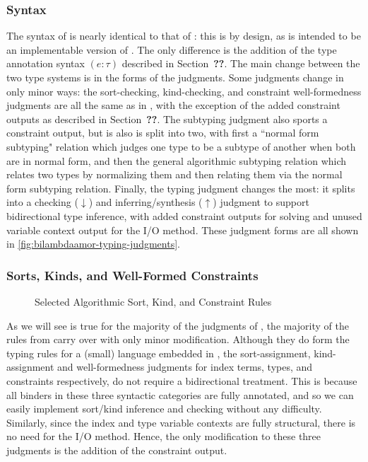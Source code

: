 \subsubsection{Syntax}
The syntax of \bilambdaamor is nearly identical to that of \dlambdaamor: this is by design, as \bilambdaamor is intended to be an implementable version of \dlambdaamor. The only difference is the addition of the type annotation syntax $(e : \tau)$ described in Section~\textbf{??}. The main change between the two type systems is in the forms of the judgments. Some judgments change in only minor ways: the sort-checking, kind-checking, and constraint well-formedness judgments are all the same as in \dlambdaamor, with the exception of the added constraint outputs as described in Section~\textbf{??}. The subtyping judgment also sports a constraint output, but is also is split into two, with first a ``normal form subtyping" relation which judges one type to be a subtype of another when both are in normal form, and then the general algorithmic subtyping relation which relates two types by normalizing them and then relating them via the normal form subtyping relation. Finally, the typing judgment changes the most: it splits into a checking ($\downarrow$) and inferring/synthesis ($\uparrow$) judgment to support bidirectional type inference, with added constraint outputs for solving and unused variable context output for the I/O method. These judgment forms are all shown in \autoref{fig:bilambdaamor-typing-judgments}.


\subsubsection{Sorts, Kinds, and Well-Formed Constraints}
\begin{figure}

\caption{Selected Algorithmic Sort, Kind, and Constraint Rules}
\label{fig:bilambdaamor-selected-sort-kind-constr-rules}
\end{figure}

As we will see is true for the majority of the judgments of \bilambdaamor, the majority of the rules from \dlambdaamor carry over with only minor modification. Although they do form the typing rules for a (small) language embedded in \bilambdaamor, the sort-assignment, kind-assignment and well-formedness judgments for index terms, types, and constraints respectively, do not require a bidirectional treatment. This is because all binders in these three syntactic categories are fully annotated, and so we can easily implement sort/kind inference and checking without any difficulty. Similarly, since the index and type variable contexts are fully structural, there is no need for the I/O method. Hence, the only modification to these three judgments is the addition of the constraint output.

